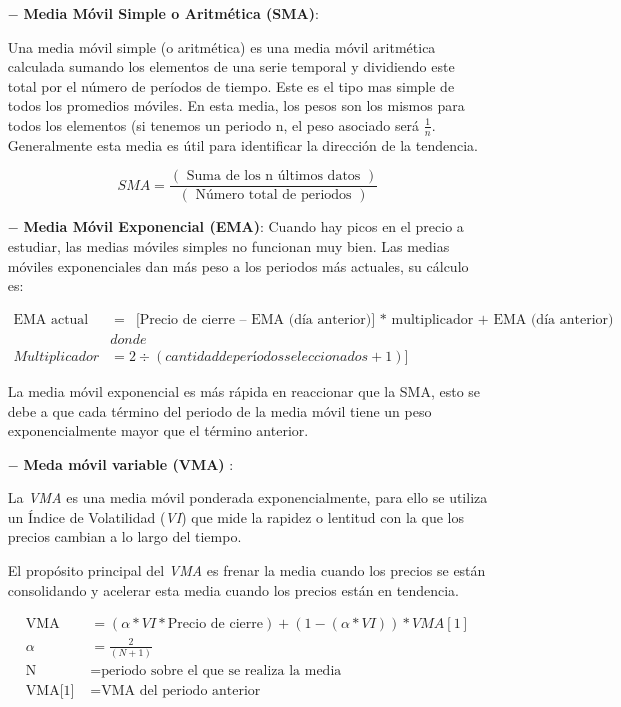 \documentclass[11pt]{article} %
\begin{document}
\begin{itemize}
	\item[$-$] \textbf{Media Móvil Simple o Aritmética (SMA)}:

Una media móvil simple (o aritmética) es una media móvil aritmética calculada sumando los elementos de una serie temporal y dividiendo este total por el número de períodos de tiempo. Este es el tipo mas simple de todos los promedios móviles. En esta media, los pesos son los mismos para todos los elementos (si tenemos un periodo n, el peso asociado será $\frac{1}{n}$. Generalmente esta media es útil para identificar la dirección de la tendencia.

$$
SMA = \dfrac{(\text{ Suma de los n últimos datos })} {(\text{ Número total de periodos })}
$$

	
	\item[$-$] \textbf{Media Móvil Exponencial (EMA)}:	
Cuando hay picos en el precio a estudiar, las medias móviles simples no funcionan muy bien. Las medias móviles exponenciales dan más peso a los periodos más actuales, su cálculo es:



\begin{align}
	\text{EMA actual }&  = \text{ [Precio de cierre – EMA (día anterior)] $*$ multiplicador + EMA (día anterior) }  \nonumber \\
	 &donde  \nonumber \\
	Multiplicador  &=  2 ÷ (cantidad de períodos seleccionados + 1)] \nonumber
\end{align}

La media móvil exponencial es más rápida en reaccionar que la SMA, esto se debe a que cada término del periodo de la media móvil tiene un peso exponencialmente mayor que el término anterior.

	
	\item[$-$] \textbf{Meda móvil variable (VMA)} \cite{vma}:
	
La \textit{VMA} es una media móvil ponderada exponencialmente, para ello se utiliza un Índice de Volatilidad (\textit{VI}) que mide la rapidez o lentitud con la que los precios cambian a lo largo del tiempo. 

El propósito principal del \textit{VMA} es frenar la media cuando los precios se están consolidando y acelerar esta media cuando los precios están en tendencia.

\begin{align}
	\text{VMA }&  = (\alpha * VI * \text{Precio de cierre})+(1-(\alpha*VI))*VMA[1] \nonumber \\
	 \alpha &  = \frac{2}{(N+1)} \nonumber \\
	\text{N }&  = \text{periodo sobre el que se realiza la media} \nonumber \\
	\text{VMA[1] }&  = \text{VMA del periodo anterior} \nonumber 
\end{align}


\end{itemize}
\end{document}
